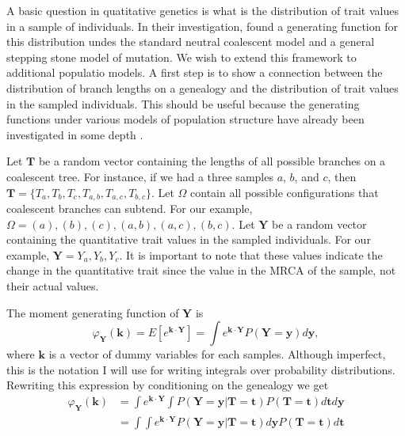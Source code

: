 A basic question in quatitative genetics is what is the distribution
of trait values in a sample of individuals. In their investigation,
\citet{Schraiber2015} found a generating function for this
distribution undes the standard neutral coalescent model and a general
stepping stone model of mutation. We wish to extend this framework to
additional populatio models. A first step is to show a connection
between the distribution of branch lengths on a genealogy and the
distribution of trait values in the sampled individuals. This should
be useful because the generating functions under various models of
population structure have already been investigated in some depth
\citep{Lohse2011}.

Let $\mathbf{T}$ be a random vector containing the lengths of all
possible branches on a coalescent tree. For instance, if we had a
three samples $a$, $b$, and $c$, then
$\mathbf{T}=\{T_a,T_b,T_c,T_{a,b},T_{a,c},T_{b,c}\}$. Let $\Omega$
contain all possible configurations that coalescent branches can
subtend. For our example, $\Omega={(a),(b),(c),(a,b),(a,c),(b,c)}$.
Let $\mathbf{Y}$ be a random vector containing the quantitative trait
values in the sampled individuals. For our example,
$\mathbf{Y}={Y_a,Y_b,Y_c}$. It is important to note that these values
indicate the change in the quantitative trait since the value in the
MRCA of the sample, not their actual values.

The moment generating function of $\mathbf{Y}$ is
\begin{equation}
  \varphi_{\mathbf{Y}}(\mathbf{k}) = E\left[ e^{\mathbf{k} \cdot \mathbf{Y}} \right] =
  \int e^{\mathbf{k} \cdot \mathbf{Y}} P(\mathbf{Y}=\mathbf{y}) d\mathbf{y},
\end{equation}
where $\mathbf{k}$ is a vector of dummy variables for each
samples. Although imperfect, this is the notation I will use for
writing integrals over probability distributions. Rewriting this
expression by conditioning on the genealogy we get
\begin{align}
  \varphi_{\mathbf{Y}}(\mathbf{k}) &= \int e^{\mathbf{k} \cdot \mathbf{Y}}
  \int P(\mathbf{Y}=\mathbf{y} | \mathbf{T}=\mathbf{t}) P(\mathbf{T}=\mathbf{t})
  d\mathbf{t} d\mathbf{y}\\
  &= \int \int e^{\mathbf{k} \cdot \mathbf{Y}} P(\mathbf{Y}=\mathbf{y} | \mathbf{T}=\mathbf{t}) d\mathbf{y}
  P(\mathbf{T}=\mathbf{t})
  d\mathbf{t}
\end{align}

